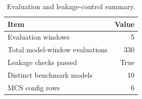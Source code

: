 \begin{table}[!htbp]
\centering
\caption{Evaluation and leakage-control summary.}
\label{tab:robustness-summary}
\begin{tabular}{lr}
\toprule
Item & Value \\
\midrule
Evaluation windows & 5 \\
Total model-window evaluations & 330 \\
Leakage checks passed & True \\
Distinct benchmark models & 10 \\
MCS config rows & 6 \\
\bottomrule
\end{tabular}
\end{table}
